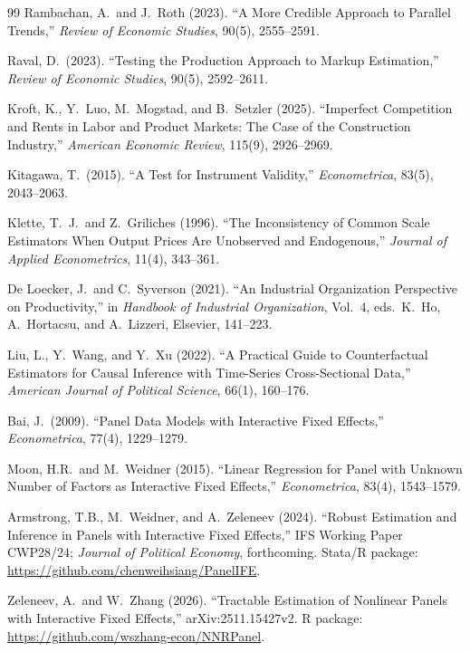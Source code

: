 \documentclass[11pt]{article}
\begin{document}
\begin{thebibliography}{99}
 Rambachan, A.\ and J.~Roth (2023). ``A More Credible Approach to Parallel Trends,'' \emph{Review of Economic Studies}, 90(5), 2555--2591.

 Raval, D.\ (2023). ``Testing the Production Approach to Markup Estimation,'' \emph{Review of Economic Studies}, 90(5), 2592--2611.

 Kroft, K., Y.~Luo, M.~Mogstad, and B.~Setzler (2025). ``Imperfect Competition and Rents in Labor and Product Markets: The Case of the Construction Industry,'' \emph{American Economic Review}, 115(9), 2926--2969.

 Kitagawa, T.\ (2015). ``A Test for Instrument Validity,'' \emph{Econometrica}, 83(5), 2043--2063.

 Klette, T.~J.\ and Z.~Griliches (1996). ``The Inconsistency of Common Scale Estimators When Output Prices Are Unobserved and Endogenous,'' \emph{Journal of Applied Econometrics}, 11(4), 343--361.

 De Loecker, J.\ and C.~Syverson (2021). ``An Industrial Organization Perspective on Productivity,'' in \emph{Handbook of Industrial Organization}, Vol.~4, eds.\ K.~Ho, A.~Hortacsu, and A.~Lizzeri, Elsevier, 141--223.

 Liu, L., Y.~Wang, and Y.~Xu (2022). ``A Practical Guide to Counterfactual Estimators for Causal Inference with Time-Series Cross-Sectional Data,'' \emph{American Journal of Political Science}, 66(1), 160--176.

 Bai, J.\ (2009). ``Panel Data Models with Interactive Fixed Effects,'' \emph{Econometrica}, 77(4), 1229--1279.

 Moon, H.R.\ and M.\ Weidner (2015). ``Linear Regression for Panel with Unknown Number of Factors as Interactive Fixed Effects,'' \emph{Econometrica}, 83(4), 1543--1579.

 Armstrong, T.B., M.\ Weidner, and A.\ Zeleneev (2024). ``Robust Estimation and Inference in Panels with Interactive Fixed Effects,'' IFS Working Paper CWP28/24; \emph{Journal of Political Economy}, forthcoming. Stata/R package: \url{https://github.com/chenweihsiang/PanelIFE}.

 Zeleneev, A.\ and W.\ Zhang (2026). ``Tractable Estimation of Nonlinear Panels with Interactive Fixed Effects,'' arXiv:2511.15427v2. R package: \url{https://github.com/wszhang-econ/NNRPanel}.


\end{thebibliography}
\end{document}

